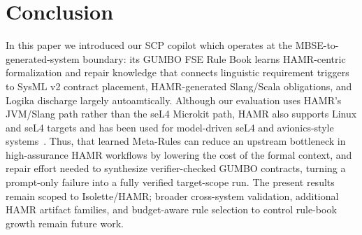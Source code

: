 \documentclass[conference]{IEEEtran}
\begin{document}
\section{Conclusion}
\label{sec:conclusion}
In this paper we introduced our SCP copilot which operates at the MBSE-to-generated-system boundary: its GUMBO FSE Rule Book learns HAMR-centric formalization and repair knowledge that connects linguistic requirement triggers to SysML v2 contract placement, HAMR-generated Slang/Scala obligations, and Logika discharge largely autoamtically. Although our evaluation uses HAMR's JVM/Slang path rather than the seL4 Microkit path, HAMR also supports Linux and seL4 targets and has been used for model-driven seL4 and avionics-style systems~\cite{hardin2025dasc}. Thus, that learned Meta-Rules can reduce an upstream bottleneck in high-assurance HAMR workflows by lowering the cost of the formal context, and repair effort needed to synthesize verifier-checked GUMBO contracts, turning a prompt-only failure into a fully verified target-scope run. The present results remain scoped to Isolette/HAMR; broader cross-system validation, additional HAMR artifact families, and budget-aware rule selection to control rule-book growth remain future work.
\end{document}
